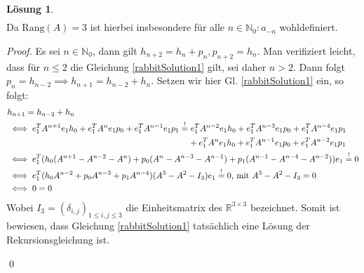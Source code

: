 \documentclass{article}
\theoremstyle{plain} %
\theoremstyle{definition} %
\newtheorem{proof}[theorem]{Beweis}
\newtheorem{solution}[theorem]{Lösung}
\newcommand{\rank}[1]{\text{Rang} (#1)}
\begin{document}
\begin{solution}
\begin{align}
  \end{align}
  Da $\rank{A}= 3$ ist hierbei insbesondere für alle $n \in \mathbb{N}_0 : a_{-n}$ wohldefiniert.
  \begin{proof}
    Es sei $n \in \mathbb{N}_0$, dann gilt $h_{n+2} = h_n + p_n, p_{n+2} = h_n$. Man verifiziert leicht, dass für $n \leq 2$ die Gleichung \ref{rabbitSolution1} gilt, sei daher $n > 2$. Dann folgt $p_n = h_{n-2} \implies h_{n+1} = h_{n-2} + h_n$. Setzen wir hier Gl. \ref{rabbitSolution1} ein, so folgt: \begin{align*}
       & h_{n+1} = h_{n-2} + h_n                                                                                                                                                                             \\
       & \iff e_1^TA^{n+1} e_1 h_0 + e_1^TA^n e_1 p_0 + e_1^TA^{n-1} e_1 p_1                                               \overset{!}{=} e_1^TA^{n-2} e_1 h_0 + e_1^TA^{n-3} e_1 p_0 + e_1^TA^{n-4} e_1 p_1 \\ & \hspace*{7.5cm} + e_1^TA^n e_1 h_0 + e_1^TA^{n-1} e_1 p_0 + e_1^TA^{n-2} e_1 p_1 \\
       & \iff e_1^T (h_0(A^{n+1} - A^{n-2} - A^{n}) + p_0(A^n - A^{n-3} - A^{n-1}) + p_1(A^{n-1} - A^{n-4} - A^{n-2})) e_1 \overset{!}{=} 0                                                                  \\
       & \iff e_1^T (h_0A^{n-2} + p_0A^{n-3} + p_1A^{n-4}) (A^3 - A^2 - I_3) e_1 \overset{!}{=} 0 \text{,  mit } A^3 - A^2 - I_3 = 0                                                                         \\
       & \iff 0 = 0
    \end{align*}
    Wobei $I_3 = (\delta_{i,j})_{1 \leq i,j \leq 3}$ die Einheitsmatrix des $\mathbb{R}^{3\times3}$ bezeichnet. Somit ist bewiesen, dass Gleichung \ref{rabbitSolution1} tatsächlich eine Lösung der Rekursionsgleichung ist.

    \qed
  \end{proof}


\end{solution}
\end{document}
